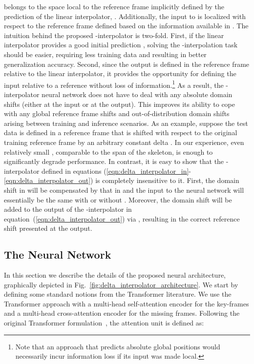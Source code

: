 \documentclass[letterpaper]{article} \usepackage[]{aaai23}  \usepackage{times}  \usepackage{helvet}  \usepackage{courier}  \usepackage[hyphens]{url}  \usepackage{graphicx} \urlstyle{rm} \def\UrlFont{\rm}  \usepackage{natbib}  \usepackage{caption} \frenchspacing  \setlength{\pdfpagewidth}{8.5in} \setlength{\pdfpageheight}{11in}
\begin{document}
belongs to the space local to the reference frame implicitly defined by the prediction of the linear interpolator, . Additionally, the input to  is localized with respect to the reference frame  defined based on the information available in . The intuition behind the proposed -interpolator is two-fold. First, if the linear interpolator provides a good initial prediction , solving the -interpolation task should be easier, requiring less training data and resulting in better generalization accuracy. Second, since the output is defined in the reference frame relative to the linear interpolator, it provides the opportunity for defining the input relative to a reference  without loss of information.\footnote{Note that an approach that predicts absolute global positions would necessarily incur information loss if its input was made local.} As a result, the -interpolator neural network does not have to deal with any absolute domain shifts (either at the input or at the output). This improves its ability to cope with any global reference frame shifts and out-of-distribution domain shifts arising between training and inference scenarios. As an example, suppose the test data is defined in a reference frame that is shifted with respect to the original training reference frame by an arbitrary constant delta . In our experience, even relatively small , comparable to the span of the skeleton, is enough to significantly degrade performance. In contrast, it is easy to show that the -interpolator defined in equations (\ref{eqn:delta_interpolator_in}-\ref{eqn:delta_interpolator_out}) is completely insensitive to it. First, the domain shift in  will be compensated by that in  and the input to the neural network will essentially be the same with or without . Moreover, the domain shift will be added  to the output of the -interpolator in equation~(\ref{eqn:delta_interpolator_out}) via , resulting in the correct reference shift presented at the output.


\subsection{The Neural Network}
In this section we describe the details of the proposed neural architecture, graphically depicted in Fig.~\ref{fig:delta_interpolator_architecture}. We start by defining some standard notions from the Transformer literature. We use the Transformer approach with a multi-head self-attention encoder for the key-frames and a multi-head cross-attention encoder for the missing frames. Following the original Transformer formulation~\cite{vaswani2017attention}, the attention unit is defined as:
\end{document}

